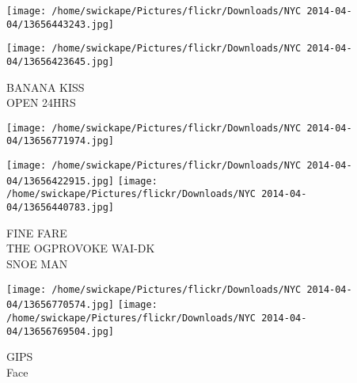 \documentclass[10pt,letterpaper]{article}
\begin{document}
\texttt{[image: /home/swickape/Pictures/flickr/Downloads/NYC 2014-04-04/13656443243.jpg]}

\vspace{0.25in}
\texttt{[image: /home/swickape/Pictures/flickr/Downloads/NYC 2014-04-04/13656423645.jpg]}

BANANA KISS\\
OPEN 24HRS\\
\pagebreak

\texttt{[image: /home/swickape/Pictures/flickr/Downloads/NYC 2014-04-04/13656771974.jpg]}

\vspace{0.25in}
\texttt{[image: /home/swickape/Pictures/flickr/Downloads/NYC 2014-04-04/13656422915.jpg]}
\texttt{[image: /home/swickape/Pictures/flickr/Downloads/NYC 2014-04-04/13656440783.jpg]}

FINE FARE\\
THE OGPROVOKE WAI{-}DK\\
SNOE MAN\\
\pagebreak

\texttt{[image: /home/swickape/Pictures/flickr/Downloads/NYC 2014-04-04/13656770574.jpg]}
\texttt{[image: /home/swickape/Pictures/flickr/Downloads/NYC 2014-04-04/13656769504.jpg]}

GIPS\\
Face\\
\pagebreak
\end{document}
